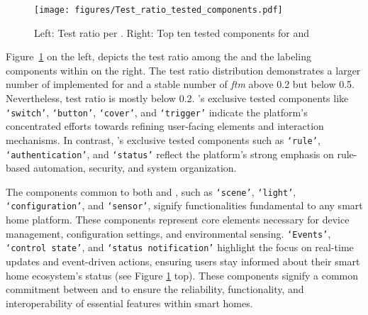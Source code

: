  \label{find:results1}


\begin{figure}[t]
  \centering
  \texttt{[image: figures/Test\_ratio\_tested\_components.pdf]}
  
  \caption{Left: Test ratio per \addon. Right: Top ten tested components for \homeassistant and \openhab}
  \label{fig:label_distribution}
\end{figure}


Figure~\ref{fig:label_distribution} on the left, depicts the test ratio among the \addons and the labeling components within \addons on the right. The test ratio distribution demonstrates a larger number of implemented \addons for \homeassistant and a stable number of \textit{ftm} above 0.2 but below 0.5. Nevertheless, \openhab test ratio is mostly below 0.2. 
\homeassistant's exclusive tested components like \texttt{`switch'}, \texttt{`button'}, \texttt{`cover'}, and \texttt{`trigger'} indicate the platform's concentrated efforts towards refining user-facing elements and interaction mechanisms. In contrast, \openhab's exclusive tested components such as \texttt{`rule'}, \texttt{`authentication'}, and \texttt{`status'} reflect the platform's strong emphasis on rule-based automation, security, and system organization. 

The components common to both \homeassistant and \openhab, such as \texttt{`scene'}, \texttt{`light'}, \texttt{`configuration'}, and \texttt{`sensor'}, signify functionalities fundamental to any smart home platform. These components represent core elements necessary for device management, configuration settings, and environmental sensing. \texttt{`Events'}, \texttt{`control state'}, and \texttt{`status notification'} highlight the focus on real-time updates and event-driven actions, ensuring users stay informed about their smart home ecosystem's status (see Figure \ref{fig:label_distribution} top). These components signify a common commitment between \homeassistant and \openhab to ensure the reliability, functionality, and interoperability of essential features within smart homes.

 \label{find:results2}



